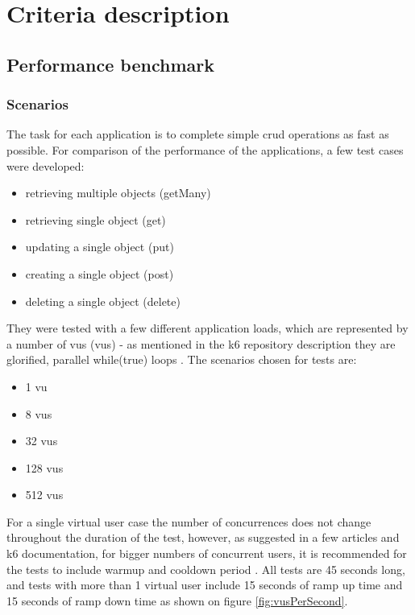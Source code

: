 
\chapter{Criteria description}

\section{Performance benchmark}

\subsection{Scenarios}\label{sub:scenarios}
The task for each application is to complete simple \acrshort{crud} operations as fast as possible. For comparison of the performance of the applications, a few test cases were developed:

\begin{itemize}
  \item retrieving multiple objects (getMany)
  \item retrieving single object (get)
  \item updating a single object (put)
  \item creating a single object (post)
  \item deleting a single object (delete)
\end{itemize}

They were tested with a few different application loads, which are represented by a number of \acrlong{vu}s (\acrshort{vu}s) - as mentioned in the k6 repository description they are glorified, parallel while(true) loops \cite{k6Git}.
The scenarios chosen for tests are:
\begin{itemize}
  \item 1 \acrshort{vu}
  \item 8 \acrshort{vu}s
  \item 32 \acrshort{vu}s
  \item 128 \acrshort{vu}s
  \item 512 \acrshort{vu}s
\end{itemize}
For a single virtual user case the number of concurrences does not change throughout the duration of the test, however, as suggested in a few articles and k6 documentation, for bigger numbers of concurrent users, it is recommended for the tests to include warmup and cooldown period \cite{whyRampUp} \cite{importanceOfRampUp} \cite{k6LoadTesting}. All tests are 45 seconds long, and tests with more than 1 virtual user include 15 seconds of ramp up time and 15 seconds of ramp down time as shown on figure \ref{fig:vusPerSecond}.

